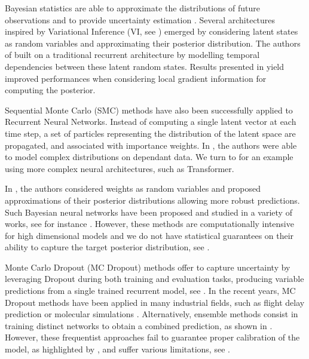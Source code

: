 \documentclass[conference]{IEEEtran}
\begin{document}
Bayesian statistics are able to approximate the distributions of future observations and to provide uncertainty estimation \cite{Hinton1995BayesianLF}.
Several architectures inspired by Variational Inference (VI, see \cite{Jordan2004AnIT}) emerged by considering latent states as random variables and approximating their posterior distribution.
The authors of \cite{Chung2015NIPS,10.5555/3157096.3157343} built on a traditional recurrent architecture by modelling temporal dependencies between these latent random states. Results presented in \cite{Fortunato2017bayesian} yield improved performances when considering local gradient information for computing the posterior.

Sequential Monte Carlo (SMC) methods have also been successfully applied to Recurrent Neural Networks.
Instead of computing a single latent vector at each time step, a set of particles representing the distribution of the latent space are propagated, and associated with importance weights.
In \cite{maddison2017filtering,naesseth2017variational}, the authors were able to model complex distributions on dependant data.
We turn to \cite{Martin2020TheMC} for an example using more complex neural architectures, such as Transformer.

In \cite{Blundell2015}, the authors considered weights as random variables and proposed approximations of their posterior distributions allowing more robust predictions. Such Bayesian neural networks have been proposed and studied in a variety of works, see for instance \cite{hernandez2015probabilistic,khan2018fast,teye2018bayesian}. However, these methods are computationally intensive for high dimensional models and we do not have statistical guarantees on their ability to capture the target  posterior distribution, see \cite{NEURIPS2020_b6dfd418}.

Monte Carlo Dropout (MC Dropout) methods offer to capture uncertainty by leveraging Dropout during both training and evaluation tasks, producing variable predictions from a single trained recurrent model, see \cite{Gal2016NIPS}.
In the recent years, MC Dropout methods have been applied in many industrial fields, such as flight delay prediction \cite{Vandal2018} or molecular simulations \cite{Wen2020UncertaintyQI}.
Alternatively, ensemble methods consist in training distinct networks to obtain a combined prediction, as shown in \cite{Pearce2018}.
However, these frequentist approaches fail to guarantee proper calibration of the model, as highlighted by \cite{ashukha2020pitfalls}, and suffer various limitations, see \cite{Fong2020}.
\end{document}
